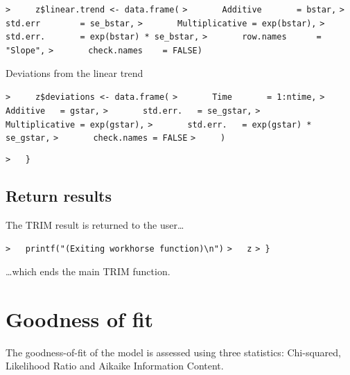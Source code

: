 \documentclass[a4paper]{article}
\begin{document}
\verb~>     z$linear.trend <- data.frame(~\newline
\verb~>       Additive       = bstar,~\newline
\verb~>       std.err        = se_bstar,~\newline
\verb~>       Multiplicative = exp(bstar),~\newline
\verb~>       std.err.       = exp(bstar) * se_bstar,~\newline
\verb~>       row.names      = "Slope",~\newline
\verb~>       check.names    = FALSE)~\par

Deviations from the linear trend\par
\verb~>     z$deviations <- data.frame(~\newline
\verb~>       Time       = 1:ntime,~\newline
\verb~>       Additive   = gstar,~\newline
\verb~>       std.err.   = se_gstar,~\newline
\verb~>       Multiplicative = exp(gstar),~\newline
\verb~>       std.err.   = exp(gstar) * se_gstar,~\newline
\verb~>       check.names = FALSE~\newline
\verb~>     )~\par

\verb~>   }~\par




\subsection{Return results}\par

The TRIM result is returned to the user\ldots\par
\verb~>   printf("(Exiting workhorse function)\n")~\newline
\verb~>   z~\newline
\verb~> }~\par
\ldots which ends the main TRIM function.


\section{Goodness of fit}\par

The goodness-of-fit of the model is assessed using three statistics:
Chi-squared, Likelihood Ratio and Aikaike Information Content.\par
\end{document}
